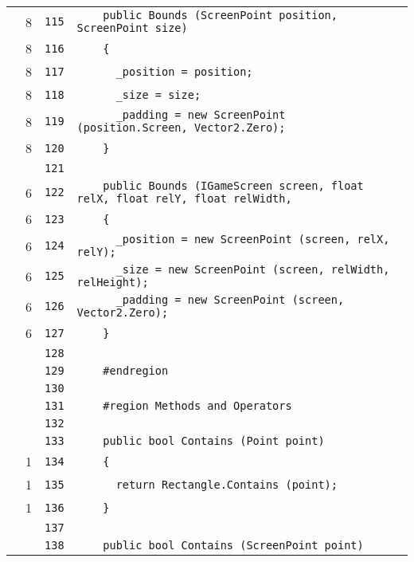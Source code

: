 \documentclass[a4paper,10pt]{article}
\begin{document}
\begin{longtable}[l]{lrrl}
\cellcolor{green} & 8 & \verb~115~ & \verb~    public Bounds (ScreenPoint position, ScreenPoint size)~\\
\cellcolor{green} & 8 & \verb~116~ & \verb~    {~\\
\cellcolor{green} & 8 & \verb~117~ & \verb~      _position = position;~\\
\cellcolor{green} & 8 & \verb~118~ & \verb~      _size = size;~\\
\cellcolor{green} & 8 & \verb~119~ & \verb~      _padding = new ScreenPoint (position.Screen, Vector2.Zero);~\\
\cellcolor{green} & 8 & \verb~120~ & \verb~    }~\\
\cellcolor{gray} &  & \verb~121~ & \verb~~\\
\cellcolor{green} & 6 & \verb~122~ & \verb~    public Bounds (IGameScreen screen, float relX, float relY, float relWidth,~\\
\cellcolor{green} & 6 & \verb~123~ & \verb~    {~\\
\cellcolor{green} & 6 & \verb~124~ & \verb~      _position = new ScreenPoint (screen, relX, relY);~\\
\cellcolor{green} & 6 & \verb~125~ & \verb~      _size = new ScreenPoint (screen, relWidth, relHeight);~\\
\cellcolor{green} & 6 & \verb~126~ & \verb~      _padding = new ScreenPoint (screen, Vector2.Zero);~\\
\cellcolor{green} & 6 & \verb~127~ & \verb~    }~\\
\cellcolor{gray} &  & \verb~128~ & \verb~~\\
\cellcolor{gray} &  & \verb~129~ & \verb~    #endregion~\\
\cellcolor{gray} &  & \verb~130~ & \verb~~\\
\cellcolor{gray} &  & \verb~131~ & \verb~    #region Methods and Operators~\\
\cellcolor{gray} &  & \verb~132~ & \verb~~\\
\cellcolor{gray} &  & \verb~133~ & \verb~    public bool Contains (Point point)~\\
\cellcolor{green} & 1 & \verb~134~ & \verb~    {~\\
\cellcolor{green} & 1 & \verb~135~ & \verb~      return Rectangle.Contains (point);~\\
\cellcolor{green} & 1 & \verb~136~ & \verb~    }~\\
\cellcolor{gray} &  & \verb~137~ & \verb~~\\
\cellcolor{gray} &  & \verb~138~ & \verb~    public bool Contains (ScreenPoint point)~\\

\end{longtable}
\end{document}
